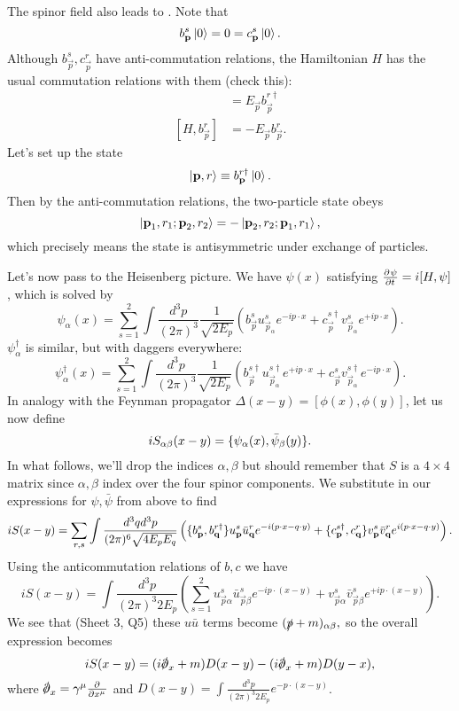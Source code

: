 The spinor field also leads to . Note that
$$b_{\vec p}^s\ket{0}=0=c_{\vec p}^s\ket{0}.$$ Although $b_{\vec p}^s, c_{\vec p}^r$ have anti-commutation relations, the Hamiltonian $H$ has the usual commutation relations with them (check this):
\begin{align*}
    [H,b_{\vec p}^{r\dagger}]&= E_{\vec p} b_{\vec p}^{r\dagger}\\
    [H,b_{\vec p}^r]&= -E_{\vec p}b_{\vec p}^r.
\end{align*}
Let's set up the state
$$\ket{\vec p, r}\equiv b_{\vec p}^{r\dagger}\ket{0}.$$
Then by the anti-commutation relations, the two-particle state obeys
$$\ket{\vec p_1,r_1; \vec p_2,r_2}=-\ket{\vec p_2,r_2; \vec p_1,r_1},$$
which precisely means the state is antisymmetric under exchange of particles.

Let's now pass to the Heisenberg picture. We have $\psi(x)$ satisfying $\P{\psi}{t}=i[H,\psi]$, which is solved by
$$\psi_\alpha(x)=\sum_{s=1}^2 \int \frac{d^3p}{(2\pi)^3}\frac{1}{\sqrt{2E_p}} (b_{\vec p}^s u_{\vec p_\alpha}^s e^{-ip\cdot x} + c_{\vec p}^{s\dagger}v_{\vec p_\alpha}^s e^{+ip\cdot x}).$$
$\psi_\alpha^\dagger$ is similar, but with daggers everywhere:
$$\psi_\alpha^\dagger(x)= \sum_{s=1}^2 \int \frac{d^3p}{(2\pi)^3}\frac{1}{\sqrt{2E_p}} (b_{\vec p}^{s\dagger} u_{\vec p_\alpha}^{s\dagger} e^{+ip\cdot x} + c_{\vec p}^{s}v_{\vec p_\alpha}^{s\dagger} e^{-ip\cdot x}).$$
In analogy with the Feynman propagator $\Delta(x-y)=[\phi(x),\phi(y)]$, let us now define
$$iS_{\alpha\beta}(x-y)=\set{\psi_\a (x),\bar \psi_\beta(y)}.$$
In what follows, we'll drop the indices $\alpha,\beta$ but should remember that $S$ is a $4\times 4$ matrix since $\alpha,\beta$ index over the four spinor components. We substitute in our expressions for $\psi,\bar\psi$ from above to find
\begin{equation}
iS(x-y)=\sum_{r,s} \int \frac{d^3q d^3p}{(2\pi)^6 \sqrt{4 E_p E_q}} \left(\set{b_{\vec p}^s, b_{\vec q}^{r\dagger}}u_{\vec p}^s \bar u_{\vec q}^r e^{-i(p\cdot x-q\cdot y)}
+\set{c_{\vec p}^{s\dagger},c_{\vec q}^r}v_{\vec p}^s \bar v_{\vec q}^r e^{i(p\cdot x-q\cdot y)} \right).
\end{equation}
Using the anticommutation relations of $b,c$ we have
$$iS(x-y)=\int \frac{d^3p}{(2\pi)^3 2E_p}\left(\sum_{s=1}^2 u_{\vec p\alpha}^s \bar u_{\vec p\beta}^s e^{-ip \cdot(x-y)}+v_{\vec p\alpha}^s \bar v_{\vec p\beta}^s e^{+ip\cdot(x-y)}\right).$$
We see that (Sheet 3, Q5) these $u\bar u$ terms become $(\slashed{p}+m)_{\alpha\beta},$ so the overall expression becomes
$$iS(x-y)=(i\slashed{\p}_x +m)D(x-y)-(i\slashed \p_x+m)D(y-x),$$
where $\slashed \p_x = \gamma^\mu \P{}{{x^\mu}}$ and $D(x-y)=\int \frac{d^3p}{(2\pi)^3 2E_p} e^{-p\cdot(x-y)}$.

